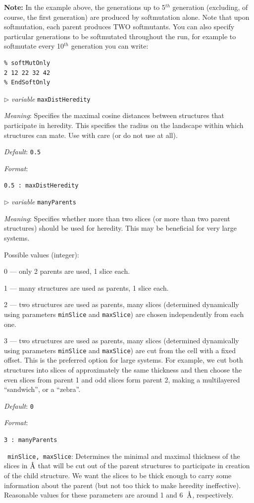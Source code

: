 \documentclass[12pt]{article}
\newcommand{\keyword}[1]{\texttt{#1}}
\newcommand{\paramacro}[6]{
\vspace{0.5cm}
$\triangleright$ \emph{variable} {\color{blue} \texttt{#1}}

\emph{Meaning}: {#2}

{#3}

\emph{Default}: \texttt{#4}

\emph{Format}:

{\addtolength{\leftskip}{10mm} 
\texttt{#5}
\par}


{\small #6}

}
\begin{document}
\textbf{Note:} In the example above, the generations up to 5$^{th}$ generation
(excluding, of course, the first generation) are produced by softmutation alone.
Note that upon softmutation, each parent produces TWO softmutants. You can also
specify particular generations to be softmutated throughout the run, for example
to softmutate every 10$^{th}$ generation you can write:
\begin{verbatim}
% softMutOnly 
2 12 22 32 42
% EndSoftOnly
\end{verbatim}


\paramacro{maxDistHeredity}{Specifies the maximal cosine distances between
structures that participate in heredity. This specifies the radius on the
landscape within which structures can mate. Use with care (or do not use at
all).}{}{0.5}{0.5 : maxDistHeredity}{}


\paramacro{manyParents}{Specifies whether more than two slices (or more than two
parent structures) should be used for heredity. This may be beneficial for very
large systems.}{

Possible values (integer): 

0 --- only 2 parents are used, 1 slice each.

1 --- many structures are used as parents, 1 slice each.

2 --- two structures are used as parents, many slices (determined dynamically
using parameters \keyword{minSlice} and \keyword{maxSlice}) are chosen
independently from each one.

3 --- two structures are used as parents, many slices (determined dynamically
using parameters \keyword{minSlice} and \keyword{maxSlice}) are cut from the
cell with a fixed offset. This is the preferred option for large systems. For
example, we cut both structures into slices of approximately the same thickness
and then choose the even slices from parent 1 and odd slices form parent 2,
making a multilayered ``sandwich'', or a ``zebra''.
}{0}{3 : manyParents }{}

\vspace{0.5cm}

\keyword{\color{blue} minSlice, maxSlice}: Determines the minimal and maximal
thickness of the slices in $\text{\r{A}}$ that will be cut out of the parent
structures to participate in creation of the child structure. We want the slices
to be thick enough to carry some information about the parent (but not too thick
to make heredity ineffective). Reasonable values for these parameters are around
1 and 6~$\text{\r{A}}$, respectively.
\end{document}
